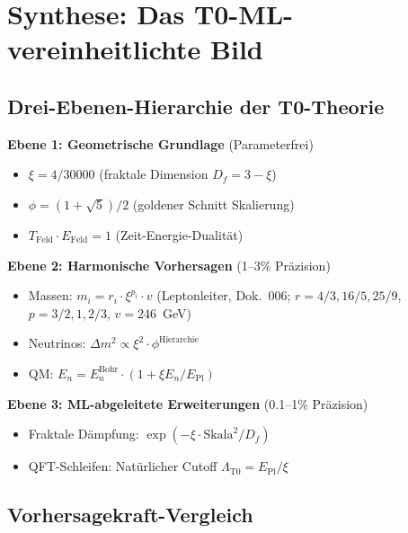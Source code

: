 \section{Synthese: Das T0-ML-vereinheitlichte Bild}
	
	\subsection{Drei-Ebenen-Hierarchie der T0-Theorie}
	
	\begin{tcolorbox}[colback=blue!5!white,colframe=blue!75!black,title={T0-Theoriestruktur}]
		\textbf{Ebene 1: Geometrische Grundlage} (Parameterfrei)
		\begin{itemize}
			\item $\xi = 4/30000$ (fraktale Dimension $D_f=3-\xi$)
			\item $\phi = (1+\sqrt{5})/2$ (goldener Schnitt Skalierung)
			\item $T_{\text{Feld}} \cdot E_{\text{Feld}} = 1$ (Zeit-Energie-Dualität)
		\end{itemize}
		
		\textbf{Ebene 2: Harmonische Vorhersagen} (1--3\% Präzision)
		\begin{itemize}
			\item Massen: $m_i = r_i \cdot \xi^{p_i} \cdot v$ (Leptonleiter, Dok.~006; $r = 4/3, 16/5, 25/9$, $p = 3/2, 1, 2/3$, $v = 246$~GeV)
			\item Neutrinos: $\Delta m^2 \propto \xi^2 \cdot \phi^{\text{Hierarchie}}$
			\item QM: $E_n = E_n^{\text{Bohr}} \cdot (1 + \xi E_n/E_{\text{Pl}})$
		\end{itemize}
		
		\textbf{Ebene 3: ML-abgeleitete Erweiterungen} (0.1--1\% Präzision)
		\begin{itemize}
			\item Fraktale Dämpfung: $\exp(-\xi \cdot \text{Skala}^2/D_f)$
			\item QFT-Schleifen: Natürlicher Cutoff $\Lambda_{\text{T0}} = E_{\text{Pl}}/\xi$
		\end{itemize}
	\end{tcolorbox}
	
	\subsection{Vorhersagekraft-Vergleich}
	
